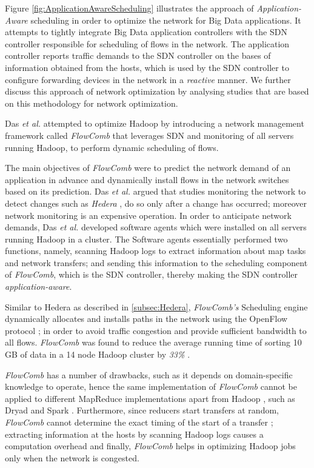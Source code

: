 Figure \ref{fig:ApplicationAwareScheduling} illustrates the approach of \textit{Application-Aware} scheduling in order to optimize the network for Big Data applications. It attempts to tightly integrate Big Data application controllers with the SDN controller responsible for scheduling of flows in the network. The application controller reports traffic demands to the SDN controller on the bases of information obtained from the hosts, which is used by the SDN controller to configure forwarding devices in the network in a \textit{reactive} manner. We further discuss this approach of network optimization by analysing studies that are based on this methodology for network optimization.
 
Das \textit{et al.} \cite{das2013transparent} attempted to optimize Hadoop by introducing a network management framework called \textit{FlowComb} that leverages SDN and monitoring of all servers running Hadoop, to perform dynamic scheduling of flows.  

The main objectives of \textit{FlowComb} were to predict the network demand of an application in advance and dynamically install flows in the network switches based on its prediction. Das \textit{et al.} argued that studies monitoring the network to detect changes such as \textit{Hedera} \cite{al2010hedera}, do so only after a change has occurred; moreover network monitoring is an expensive operation. In order to anticipate network demands, Das \textit{et al.} developed software agents which were installed on all servers running Hadoop in a cluster. The Software agents essentially performed two functions, namely, scanning Hadoop logs to extract information about map tasks and network transfers; and sending this information to the scheduling component of \textit{FlowComb}, which is the SDN controller, thereby making the SDN controller \textit{application-aware}. 

Similar to Hedera \cite{al2010hedera} as described in \ref{subsec:Hedera}, \textit{FlowComb's} Scheduling engine dynamically allocates and installs paths in the network using the OpenFlow protocol \cite{mckeown2008openflow}; in order to avoid traffic congestion and provide sufficient bandwidth to all flows. \textit{FlowComb} was found to reduce the average running time of sorting 10 GB of data in a 14 node Hadoop cluster by \textit{33\%} \cite{das2013transparent}. 

\textit{FlowComb} has a number of drawbacks, such as it depends on domain-specific knowledge to operate, hence the same implementation of \textit{FlowComb} cannot be applied to different MapReduce implementations apart from Hadoop \cite{HadoopWeb}, such as Dryad \cite{isard2007dryad} and Spark \cite{SparkWeb}. Furthermore, since reducers start transfers at random, \textit{FlowComb} cannot determine the exact timing of the start of a transfer \cite{das2013transparent}; extracting information at the hosts by scanning Hadoop logs causes a computation overhead and finally, \textit{FlowComb} helps in optimizing Hadoop jobs only when the network is congested. 

